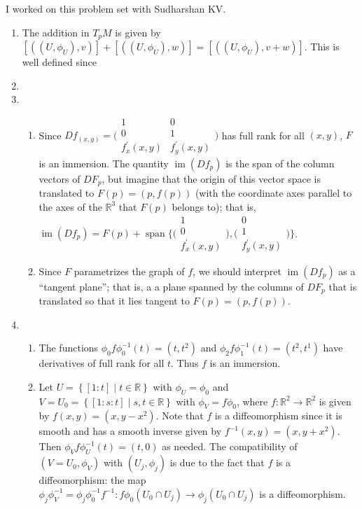 \documentclass[11pt,leqno]{article}
\theoremstyle{plain}
\theoremstyle{definition}
\numberwithin{equation}{section}
\numberwithin{lem}{section}
\newcommand{\cbr}[1]{\left\{#1\right\}}
\DeclareMathOperator{\Span}{span}
\DeclareMathOperator{\im}{im}
\begin{document}
I worked on this problem set with Sudharshan KV.
\begin{enumerate}
    \item The addition in $T_pM$ is given by $[((U,\phi_U),v)] + [((U,\phi_U),w)] = [((U,\phi_U),v+w)]$. This is well defined since 
    \item 
    \item \begin{enumerate}
      \item Since $Df_{(x,y)} = \Big(\!\begin{smallmatrix}
        1 & 0 \\
        0 & 1 \\ 
        f^\prime_x(x,y) & f^\prime_y(x,y)
      \end{smallmatrix}\!\Big)$ has full rank for all $(x,y)$, $F$ is an immersion. The quantity $\im(Df_p)$ is the span of the column vectors of $DF_p$, but imagine that the origin of this vector space is translated to $F(p) = (p,f(p))$ (with the coordinate axes parallel to the axes of the $\mathbb R^3$ that $F(p)$ belongs to); that is, $\im (Df_p) = F(p) + \Span\Big\{\Big(\!\begin{smallmatrix}
        1  \\
        0  \\ 
        f^\prime_x(x,y) 
      \end{smallmatrix}\!\Big), \Big(\!\begin{smallmatrix}
         0 \\
         1 \\ 
         f^\prime_y(x,y)
      \end{smallmatrix}\!\Big)\Big\}$.
      \item Since $F$ parametrizes the graph of $f$, we should interpret $\im(Df_p)$ as a ``tangent plane''; that is, a a plane spanned by the columns of $DF_p$ that is translated so that it lies tangent to $F(p) = (p,f(p))$.
    \end{enumerate}
    \item \begin{enumerate}
      \item The functions $\phi_0f\phi_0^{-1}(t)=
      (t,t^2)$ and $\phi_2f\phi_1^{-1}(t)=(t^2,t^1)$ have derivatives of full rank for all $t$. Thus $f$ is an immersion.
      \item Let $U = \cbr{[1:t]\mid t\in \mathbb R}$ with $\phi_U = \phi_0$ and $V = U_0 = \cbr{[1:s:t]\mid s,t\in\mathbb R}$ with $\phi_V = f\phi_0$, where $f\colon\mathbb R^2\to\mathbb R^2$ is given by $f(x,y) = (x,y-x^2)$. Note that $f$ is a diffeomorphism since it is smooth and has a smooth inverse given by $f^{-1}(x,y) = (x,y+x^2)$. Then $\phi_Vf\phi_U^{-1}(t) = (t,0)$ as needed. The compatibility of $(V = U_0,\phi_V)$ with $(U_j,\phi_j)$ is due to the fact that $f$ is a diffeomorphism: the map $\phi_{j}\phi_{V}^{-1} = \phi_j\phi_0^{-1}f^{-1}\colon f\phi_0(U_0\cap U_j)\to \phi_j(U_0\cap U_j)$ is a diffeomorphism.

\end{enumerate}
\end{enumerate}
\end{document}
